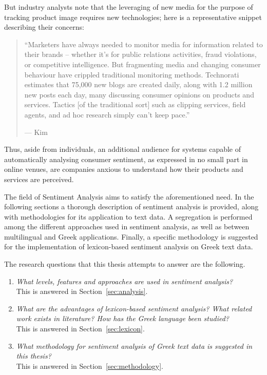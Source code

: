 But industry analysts note that the leveraging of new media for the
purpose of tracking product image requires new technologies; here is a
representative snippet describing their concerns:

\begin{quote}
``Marketers have always needed to monitor media
for information related to their brands --
whether it's for public relations activities,
fraud violations, or competitive intelligence.
But fragmenting media and changing consumer behaviour
have crippled traditional monitoring methods.
Technorati estimates that 75,000 new blogs are created daily,
along with 1.2 million new posts each day,
many discussing consumer opinions on products and services.
Tactics [of the traditional sort]
such as clipping services, field agents,
and ad hoc research simply can't keep pace.''

\hfill --- Kim~\cite{Kim06}
\end{quote}

Thus, aside from individuals, an additional audience for systems capable
of automatically analysing consumer sentiment, as expressed in no
small part in online venues, are companies anxious to understand how
their products and services are perceived.

The field of Sentiment Analysis aims to satisfy the aforementioned need.
In the following sections a thorough description of sentiment analysis is provided,
along with methodologies for its application to text data.
A segregation is performed
among the different approaches used in sentiment analysis,
as well as between multilingual and Greek applications.
Finally, a specific methodology is suggested for the implementation
of lexicon-based sentiment analysis on Greek text data.

The research questions that this thesis attempts to answer are the following.

\begin{enumerate}
 \item \emph{What levels, features and approaches are used in sentiment analysis?} \\
 This is answered in Section~\ref{sec:analysis}.
 \item \emph{What are the advantages of lexicon-based sentiment analysis?
 What related work exists in literature?
 How has the Greek language been studied?} \\
 This is answered in Section~\ref{sec:lexicon}.
 \item \emph{What methodology for sentiment analysis of Greek text data is suggested in this thesis?} \\
 This is answered in Section~\ref{sec:methodology}.
\end{enumerate}
